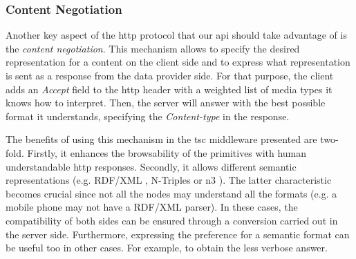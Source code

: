 \subsubsection{Content Negotiation}
Another key aspect of the \acs{http} protocol that our \acs{api} should take advantage of is the \textit{content negotiation}.
This mechanism allows to specify the desired representation for a content on the client side and to express what representation is sent as a response from the data provider side.
For that purpose, the client adds an \textit{Accept} field to the \acs{http} header with a weighted list of media types it knows how to interpret.
Then, the server will answer with the best possible format it understands, specifying the \textit{Content-type} in the response.

The benefits of using this mechanism in the \ac{tsc} middleware presented are two-fold.
Firstly, it enhances the browsability of the primitives with human understandable \acs{http} responses. %
Secondly, it allows different semantic representations (e.g. RDF/XML , N-Triples  or \acs{n3} ).
The latter characteristic becomes crucial since not all the nodes may understand all the formats (e.g. a mobile phone may not have a RDF/XML parser).
In these cases, the compatibility of both sides can be ensured through a conversion carried out in the server side.
Furthermore, expressing the preference for a semantic format can be useful too in other cases.
For example, to obtain the less verbose answer.
